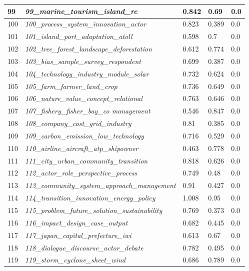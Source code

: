 \documentclass[12pt]{article}
\begin{document}
\begin{longtable}{|l|l|l|l|l|}
99 & \textit{99\_marine\_tourism\_island\_rc} & 0.842 & 0.69 & 0.0 \\ \hline
100 & \textit{100\_process\_system\_innovation\_actor} & 0.823 & 0.389 & 0.0 \\ \hline
101 & \textit{101\_island\_port\_adaptation\_atoll} & 0.598 & 0.7 & 0.0 \\ \hline
102 & \textit{102\_tree\_forest\_landscape\_deforestation} & 0.612 & 0.774 & 0.0 \\ \hline
103 & \textit{103\_bias\_sample\_survey\_respondent} & 0.699 & 0.387 & 0.0 \\ \hline
104 & \textit{104\_technology\_industry\_module\_solar} & 0.732 & 0.624 & 0.0 \\ \hline
105 & \textit{105\_farm\_farmer\_land\_crop} & 0.736 & 0.649 & 0.0 \\ \hline
106 & \textit{106\_nature\_value\_concept\_relational} & 0.763 & 0.646 & 0.0 \\ \hline
107 & \textit{107\_fishery\_fisher\_bay\_co management} & 0.546 & 0.847 & 0.0 \\ \hline
108 & \textit{108\_company\_cost\_grid\_industry} & 0.81 & 0.385 & 0.0 \\ \hline
109 & \textit{109\_carbon\_emission\_low\_technology} & 0.716 & 0.529 & 0.0 \\ \hline
110 & \textit{110\_airline\_aircraft\_atp\_shipowner} & 0.463 & 0.778 & 0.0 \\ \hline
111 & \textit{111\_city\_urban\_community\_transition} & 0.818 & 0.626 & 0.0 \\ \hline
112 & \textit{112\_actor\_role\_perspective\_process} & 0.749 & 0.48 & 0.0 \\ \hline
113 & \textit{113\_community\_system\_approach\_management} & 0.91 & 0.427 & 0.0 \\ \hline
114 & \textit{114\_transition\_innovation\_energy\_policy} & 1.008 & 0.95 & 0.0 \\ \hline
115 & \textit{115\_problem\_future\_solution\_sustainability} & 0.769 & 0.373 & 0.0 \\ \hline
116 & \textit{116\_impact\_design\_case\_output} & 0.682 & 0.445 & 0.0 \\ \hline
117 & \textit{117\_japan\_capital\_prefecture\_iwi} & 0.613 & 0.67 & 0.0 \\ \hline
118 & \textit{118\_dialogue\_discourse\_actor\_debate} & 0.782 & 0.495 & 0.0 \\ \hline
119 & \textit{119\_storm\_cyclone\_sheet\_wind} & 0.686 & 0.789 & 0.0 \\ \hline

\end{longtable}
\end{document}
